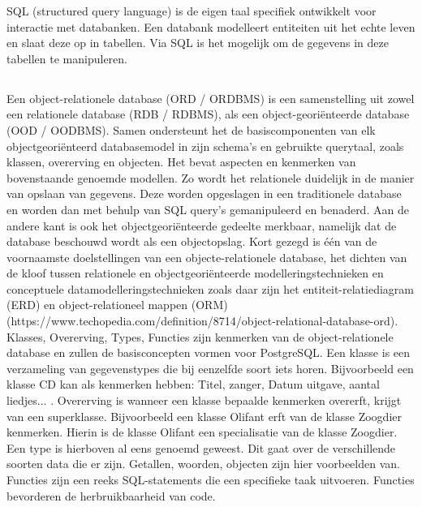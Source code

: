 SQL (structured query language) is de eigen taal specifiek ontwikkelt voor interactie met databanken. Een databank modelleert entiteiten uit het echte leven en slaat deze op in tabellen. Via SQL is het mogelijk om de gegevens in deze tabellen te manipuleren.  %


\subsection{}
\label{subsec:Object-relationele databank}

Een object-relationele database (ORD / ORDBMS) is een samenstelling uit zowel een relationele database (RDB / RDBMS), als een object-georiënteerde database (OOD / OODBMS). Samen ondersteunt het de basiscomponenten van elk objectgeoriënteerd databasemodel in zijn schema's en gebruikte querytaal, zoals klassen, overerving en objecten. Het bevat aspecten en kenmerken van bovenstaande genoemde modellen. Zo wordt het relationele duidelijk in de manier van opslaan van gegevens. Deze worden opgeslagen in een traditionele database en worden dan met behulp van SQL query's gemanipuleerd en benaderd. Aan de andere kant is ook het objectgeoriënteerde gedeelte merkbaar, namelijk dat de database beschouwd wordt als een objectopslag. Kort gezegd is één van de voornaamste doelstellingen van een objecte-relationele database, het dichten van de kloof tussen relationele en objectgeoriënteerde modelleringstechnieken en conceptuele datamodelleringstechnieken zoals daar zijn het entiteit-relatiediagram (ERD) en object-relationeel mappen (ORM) (https://www.techopedia.com/definition/8714/object-relational-database-ord).
Klasses, Overerving, Types, Functies zijn kenmerken van de object-relationele database en zullen de basisconcepten vormen voor PostgreSQL. Een klasse is een verzameling van gegevenstypes die bij eenzelfde soort iets horen. Bijvoorbeeld een klasse CD kan als kenmerken hebben: Titel, zanger, Datum uitgave, aantal liedjes... . Overerving is wanneer een klasse bepaalde kenmerken overerft, krijgt van een superklasse. Bijvoorbeeld een klasse Olifant erft van de klasse Zoogdier kenmerken. Hierin is de klasse Olifant een specialisatie van de klasse Zoogdier. Een type is hierboven al eens genoemd geweest. Dit gaat over de verschillende soorten data die er zijn. Getallen, woorden, objecten zijn hier voorbeelden van. Functies zijn een reeks SQL-statements die een specifieke taak uitvoeren. Functies bevorderen de herbruikbaarheid van code.


